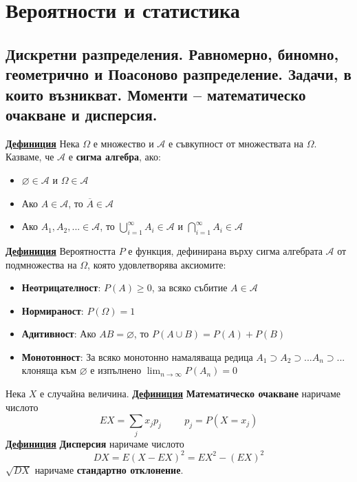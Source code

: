 \documentclass{article}
\begin{document}
\section*{Вероятности и статистика}

\subsection*{Дискретни разпределения. Равномерно, биномно, геометрично и Поасоново разпределение. Задачи, в които възникват.
Моменти – математическо очакване и дисперсия.}

\textbf{\underline{Дефиниция}}
Нека $\Omega$ е множество и $\mathcal{A}$ е съвкупност от множествата на $\Omega$. Казваме, че $\mathcal{A}$
е \textbf{сигма алгебра}, ако:
\begin{itemize}
    \item $\varnothing \in \mathcal{A}$ и $\Omega \in \mathcal{A}$
    \item Ако $A \in \mathcal{A}$, то $\overline{A} \in \mathcal{A}$
    \item Ако $A_1, A_2, ... \in \mathcal{A}$, то $\bigcup\limits_{i=1}^\infty A_i \in \mathcal{A}$ и
    $\bigcap\limits_{i=1}^\infty A_i \in \mathcal{A}$
\end{itemize}
\textbf{\underline{Дефиниция}}
Вероятността $P$ е функция, дефинирана върху сигма алгебрата $\mathcal{A}$ от подмножества на $\Omega$, която удовлетворява
аксиомите:
\begin{itemize}
    \item \textbf{Неотрицателност}: $P(A) \ge 0$, за всяко събитие $A \in \mathcal{A}$
    \item \textbf{Нормираност}: $P(\Omega) = 1$
    \item \textbf{Адитивност}: Ако $AB = \varnothing$, то $P(A \cup B) = P(A) + P(B)$
    \item \textbf{Монотонност}: За всяко монотонно намаляваща редица $A_1 \supset A_2 \supset ... A_n \supset ...$ клоняща
    към $\varnothing$ е изпълнено $\lim _{n \to \infty}P(A_n) = 0$
\end{itemize}
Нека $X$ е случайна величина. \newline\newline
\textbf{\underline{Дефиниция}}
\textbf{Математическо очакване} наричаме числото $$EX = \sum_{j}x_jp_j \hspace{1cm} p_j = P(X = x_j)$$
\textbf{\underline{Дефиниция}}
\textbf{Дисперсия} наричаме числото $$DX = E(X - EX)^2 = EX^2 - (EX)^2$$ $\sqrt{DX}$ наричаме \textbf{стандартно отклонение}. \newline\newline
\end{document}
